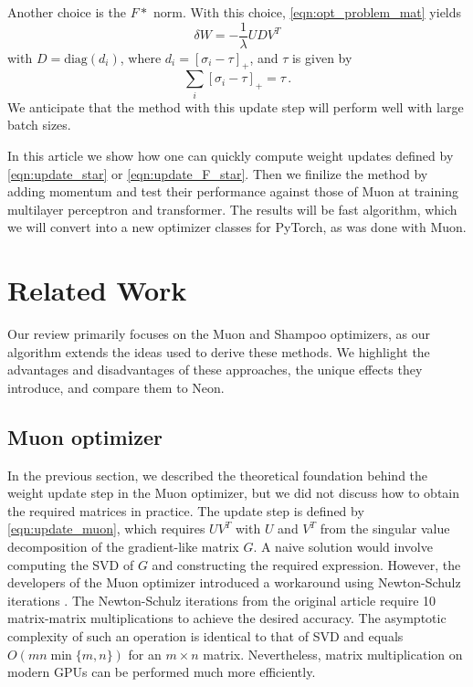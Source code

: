 \documentclass{article} %
\begin{document}
Another choice is the $F*$ norm. With this choice, \eqref{eqn:opt_problem_mat} yields 
\begin{equation}\label{eqn:update_F_star}
\delta W = -\frac{1}{\lambda}UDV^T
\end{equation} 
with $D = \text{diag}(d_i)$, where $d_i = [\sigma_i - \tau]_+$, and $\tau$ is given by
\begin{equation}
    \sum_{i} [\sigma_i - \tau]_+ = \tau\,.
\end{equation}
We anticipate that the method with this update step will perform well with large batch sizes.

In this article we show how one can quickly compute weight updates defined by \eqref{eqn:update_star} or \eqref{eqn:update_F_star}. Then we finilize the method by adding momentum and test their performance against those of Muon at training multilayer perceptron and transformer. The results will be fast algorithm, which we will convert into a new optimizer classes for PyTorch, as was done with Muon.

\section{Related Work}
Our review primarily focuses on the Muon and Shampoo optimizers, as our algorithm extends the ideas used to derive these methods. We highlight the advantages and disadvantages of these approaches, the unique effects they introduce, and compare them to Neon.

\subsection{Muon optimizer}

In the previous section, we described the theoretical foundation behind the weight update step in the Muon optimizer, but we did not discuss how to obtain the required matrices in practice. The update step is defined by \eqref{eqn:update_muon}, which requires $UV^T$ with $U$ and $V^T$ from the singular value decomposition of the gradient-like matrix $G$. A naive solution would involve computing the SVD of $G$ and constructing the required expression. However, the developers of the Muon optimizer introduced a workaround using Newton-Schulz iterations \cite{jordan2024muon}. The Newton-Schulz iterations from the original article \cite{jordan2024muon} require 10 matrix-matrix multiplications to achieve the desired accuracy. The asymptotic complexity of such an operation is identical to that of SVD and equals $O(mn \min\{m, n\})$ for an $m \times n$ matrix. Nevertheless, matrix multiplication on modern GPUs can be performed much more efficiently.
\end{document}
